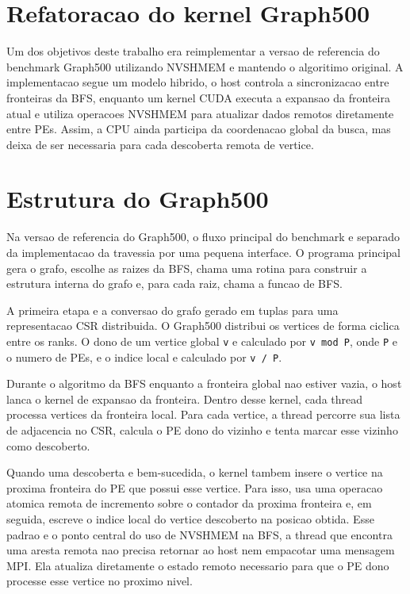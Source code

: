 \documentclass{article}
\begin{document}
\section{Refatoracao do kernel Graph500}
Um dos objetivos deste trabalho era reimplementar a versao de referencia do
benchmark Graph500 utilizando NVSHMEM e mantendo o algoritimo original. 
A implementacao segue um modelo hibrido, o host controla a sincronizacao 
entre fronteiras da BFS, enquanto um kernel 
CUDA executa a expansao da fronteira atual e utiliza operacoes NVSHMEM para atualizar 
dados remotos diretamente entre PEs. Assim, a CPU ainda participa da coordenacao global 
da busca, mas deixa de ser necessaria para cada descoberta remota de vertice.

\section{Estrutura do Graph500}
Na versao de referencia do Graph500, o fluxo principal do benchmark e separado
da implementacao da travessia por uma pequena interface. O programa principal
gera o grafo, escolhe as raizes da BFS, chama uma rotina para construir a
estrutura interna do grafo e, para cada raiz, chama a funcao de BFS.

A primeira etapa e a conversao do grafo gerado em tuplas para uma representacao
CSR distribuida. O Graph500 distribui os vertices de forma ciclica entre os
ranks. O dono de um vertice global \texttt{v} e calculado por \texttt{v mod P},
onde \texttt{P} e o numero de PEs, e o indice local e calculado por \texttt{v / P}.

Durante o algoritmo da BFS enquanto a fronteira global nao estiver vazia, 
o host lanca o kernel de expansao
da fronteira. Dentro desse kernel, cada thread processa vertices da fronteira
local. Para cada vertice, a thread percorre sua lista de adjacencia no CSR,
calcula o PE dono do vizinho e tenta marcar esse vizinho como descoberto.

Quando uma descoberta e bem-sucedida, o kernel tambem insere o vertice na
proxima fronteira do PE que possui esse vertice. Para isso, usa uma operacao
atomica remota de incremento sobre o contador da proxima fronteira e, em
seguida, escreve o indice local do vertice descoberto na posicao obtida. Esse
padrao e o ponto central do uso de NVSHMEM na BFS, a thread que encontra uma
aresta remota nao precisa retornar ao host nem empacotar uma mensagem MPI. Ela
atualiza diretamente o estado remoto necessario para que o PE dono processe esse
vertice no proximo nivel.
\end{document}
